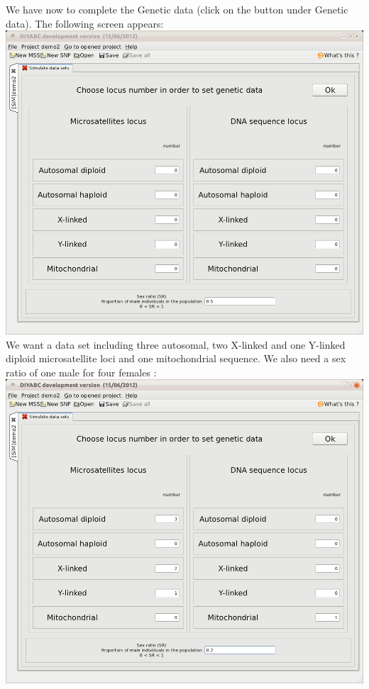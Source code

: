 We have now to complete the Genetic data (click on the  button under \textsf{Genetic data}). The following screen appears:\\

\includegraphics[scale=0.33]{gui_pictures/Capture-DIYABC-71.png} \\

We want a data set including three autosomal, two X-linked and one Y-linked diploid microsatellite loci and one mitochondrial sequence. We also need a sex ratio of one male for four females :\\

\includegraphics[scale=0.33]{gui_pictures/Capture-DIYABC-72.png} \\

